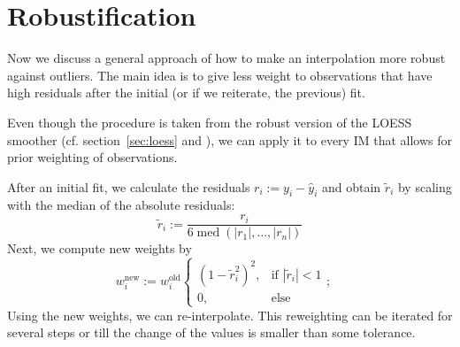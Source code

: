 \section{Robustification}{
	\label{sec:loess_robustify}
	{ %
		Now we discuss a general approach of how to make an interpolation more robust against outliers. The main idea is to give less weight to observations that have high residuals after the initial (or if we reiterate, the previous) fit.

		Even though the procedure is taken from the robust version of the LOESS smoother (cf. section~\ref{sec:loess} and \cite{clevelandRobustLocallyWeighted1979}), we can apply it to every {{IM}} that allows for prior weighting of observations.
	}
	
	{	
		After an initial fit, we calculate the residuals $r_i := y_i - \hat y_i$ and obtain $\tilde r_i$ by scaling with the median of the absolute residuals: 
		\begin{equation}
			\tilde r_i := \frac{r_i}{6\operatorname{med}\left(|r_1|,\dots,|r_n|\right)}
		\end{equation}
		Next, we compute new weights by
		\begin{equation}
			w_i^\text{new}:=w_i^\text{old} \begin{cases}
				\left(1-\tilde r_i^{2}\right)^{2}, & \text{if } |\tilde r_i|<1 \\
				0,                        & \text{else }
			\end{cases};\quad
			\label{eq:bisquare}
		\end{equation}
		Using the new weights, we can re-interpolate. This reweighting can be iterated for several steps or till the change of the values is smaller than some tolerance.

	}

}
